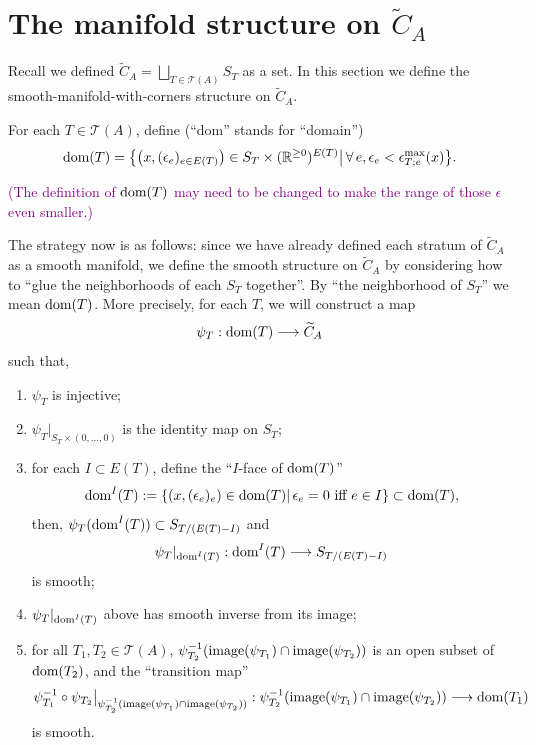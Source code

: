 \documentclass[11pt]{article}
\theoremstyle{definition}
\theoremstyle{remark}
\def\wt#1{\widetilde{#1}}
\def\R{\mathbb{R}}
\def\cT{\mathcal{T}}
\def\dom{{\tn{dom}}}
\def\cmt#1{\textcolor{purple}{(#1)}}
\def\tn#1{\textnormal{#1}}
\begin{document}
\section{The manifold structure on \texorpdfstring{$\wt{C}_A$}{the big configuration space}}
\label{conftilde_sec}

Recall we defined $\wt{C}_A=\bigsqcup_{T\in\cT(A)}S_T$ as a set. 
In this section we define the smooth-manifold-with-corners structure on $\wt{C}_A$. 


For each $T\in\cT(A)$, define (``dom'' stands for ``domain'')
$$\dom(T)=\big\{\big(x,(\epsilon_e)_{e\in E(T)}\big)\in S_T\times(\R^{\ge0})^{E(T)}\big|\,\forall\,e, \epsilon_e<\epsilon^{\max}_{T;e}(x)\big\}.$$

\cmt{The definition of $\dom(T)$ may need to be changed to make the range of those $\epsilon$ even smaller.}

The strategy now is as follows: since we have already defined each stratum of $\wt{C}_A$ as a smooth manifold, we define the smooth structure on $\wt{C}_A$ by considering how to ``glue the neighborhoods of each $S_T$ together''. 
By ``the neighborhood of $S_T$'' we mean $\dom(T)$. 
More precisely, for each $T$, we will construct a map 
$$\psi_T:\dom(T)\longrightarrow \widetilde{C}_A$$
such that, 
\begin{enumerate}
\item \label{psi1_item} $\psi_T$ is injective;

\item \label{psi2_item} $\psi_T|_{S_T\times(0,\ldots,0)}$ is the identity map on $S_T$; 

\item \label{psi3_item} for each $I\subset E(T)$, define the ``$I$-face of $\dom(T)$''
$$\dom^I(T):=\{(x,(\epsilon_e)_e)\in\dom(T) |\,\epsilon_e=0 \tn{ iff } e\in I\}\subset \dom(T),$$
then, 
$\psi_T(\dom^I(T))\subset S_{T/(E(T)-I)}$
and 
$$\psi_T|_{\dom^I(T)}:\dom^I(T)\longrightarrow S_{T/(E(T)-I)}$$
is smooth; 

\item \label{psi4_item} $\psi_T|_{\dom^I(T)}$ above has smooth inverse from its image; 

\item \label{psi5_item} for all $T_1,T_2\in\cT(A)$, $\psi_{T_2}^{-1}(\tn{image}(\psi_{T_1})\cap\tn{image}(\psi_{T_2}))$ is an open subset of $\dom(T_2)$, and the ``transition map'' 
$$\psi_{T_1}^{-1}\circ\psi_{T_2}\big|_{\psi_{T_2}^{-1}(\tn{image}(\psi_{T_1})\cap\tn{image}(\psi_{T_2}))}:\psi_{T_2}^{-1}(\tn{image}(\psi_{T_1})\cap\tn{image}(\psi_{T_2}))\longrightarrow \dom(T_1)$$
is smooth. 
\end{enumerate}
\end{document}
